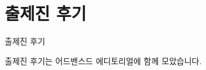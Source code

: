 
\section{출제진 후기}

\begin{frame}[label=afterword]{출제진 후기}
    \begin{center}
        출제진 후기는 어드밴스드 에디토리얼에 함께 모았습니다.

        \vspace{5mm}
    \end{center}
\end{frame}
